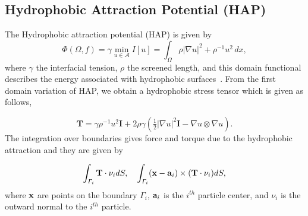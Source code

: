 \documentclass[lineno]{jfm}
\begin{document}




%



\subsection{Hydrophobic Attraction Potential (HAP)}


The Hydrophobic attraction potential (HAP) is given by
\begin{equation}
\label{eq:main}
\Phi(\Omega,f) = \gamma  \min_{u \in \mathcal{A}}
 I[u]  = \int_{\Omega} \rho |\nabla u|^2 + \rho^{-1} u^2 \,dx,
\end{equation}
%
where $\gamma$ the interfacial tension, $\rho$ the screened length, and this domain functional describes the energy associated with hydrophobic surfaces~\cite{Fu20}. From the first domain variation of HAP, we obtain a hydrophobic stress tensor which is given as follows, 

\begin{equation}
\label{eq:stress}
\mathbf{T}
= \gamma\rho^{-1}u^2 \mathbf{I} + 2\rho\gamma (\tfrac{1}{2}|\nabla u|^2 \mathbf{I} - \nabla u\otimes \nabla u).
\end{equation}
%
The integration over boundaries gives force and torque due to the hydrophobic attraction and they are given by 

\begin{equation}
\int_{\Gamma_i} {\bf T}\cdot \nu_i dS ,\quad \int_{\Gamma_i} ({\bf x}-{\bf a}_i)\times ({\bf T}\cdot \nu_i) dS,
\end{equation}
%
where ${\bf x}$ are points on the boundary $\Gamma_i$, ${\bf a}_i$ is the $i^{th}$ particle center, and $\nu_i$ is the outward normal to the $i^{th}$ particle.


\end{document}
